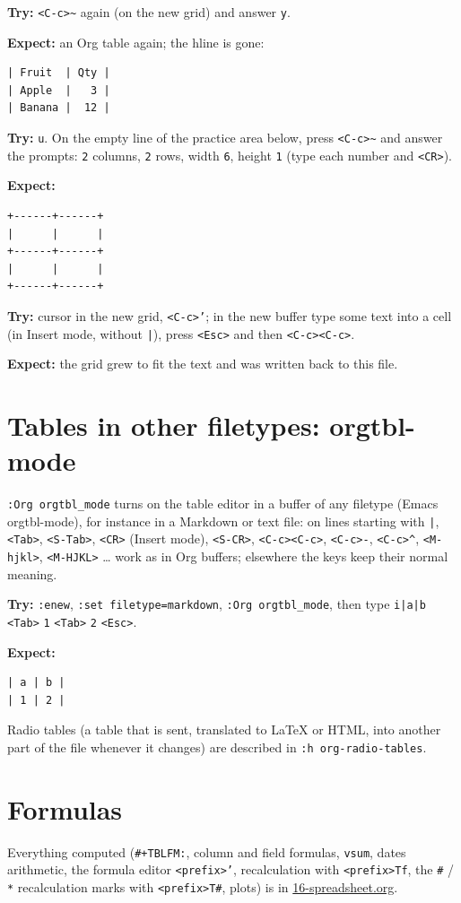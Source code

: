 \textbf{Try:} \texttt{<C-c>\textasciitilde{}} again (on the new grid) and answer \texttt{y}.

\textbf{Expect:} an Org table again; the hline is gone:
\begin{verbatim}
| Fruit  | Qty |
| Apple  |   3 |
| Banana |  12 |
\end{verbatim}

\textbf{Try:} \texttt{u}. On the empty line of the practice area below, press \texttt{<C-c>\textasciitilde{}}
and answer the prompts: \texttt{2} columns, \texttt{2} rows, width \texttt{6}, height \texttt{1} (type
each number and \texttt{<CR>}).

\textbf{Expect:}
\begin{verbatim}
+------+------+
|      |      |
+------+------+
|      |      |
+------+------+
\end{verbatim}

\textbf{Try:} cursor in the new grid, \texttt{<C-c>'}; in the new buffer type some text
into a cell (in Insert mode, without \texttt{|}), press \texttt{<Esc>} and then
\texttt{<C-c><C-c>}.

\textbf{Expect:} the grid grew to fit the text and was written back to this file.
\section{Tables in other filetypes: orgtbl-mode}
\label{sec:org529bed1}
\texttt{:Org orgtbl\_mode} turns on the table editor in a buffer of any filetype
(Emacs orgtbl-mode), for instance in a Markdown or text file: on lines
starting with \texttt{|}, \texttt{<Tab>}, \texttt{<S-Tab>}, \texttt{<CR>} (Insert mode), \texttt{<S-CR>},
\texttt{<C-c><C-c>}, \texttt{<C-c>-}, \texttt{<C-c>\textasciicircum{}}, \texttt{<M-hjkl>}, \texttt{<M-HJKL>} \ldots{} work as in
Org buffers; elsewhere the keys keep their normal meaning.

\textbf{Try:} \texttt{:enew}, \texttt{:set filetype=markdown}, \texttt{:Org orgtbl\_mode}, then type
\texttt{i|a|b} \texttt{<Tab>} \texttt{1} \texttt{<Tab>} \texttt{2} \texttt{<Esc>}.

\textbf{Expect:}
\begin{verbatim}
| a | b |
| 1 | 2 |
\end{verbatim}

Radio tables (a table that is sent, translated to \LaTeX{} or HTML, into
another part of the file whenever it changes) are described in
\texttt{:h org-radio-tables}.
\section{Formulas}
\label{sec:orge3a656f}
Everything computed (\texttt{\#+TBLFM:}, column and field formulas, \texttt{vsum}, dates
arithmetic, the formula editor \texttt{<prefix>'}, recalculation with
\texttt{<prefix>Tf}, the \texttt{\#} / \texttt{*} recalculation marks with \texttt{<prefix>T\#}, plots)
is in \href{16-spreadsheet.org}{16-spreadsheet.org}.
